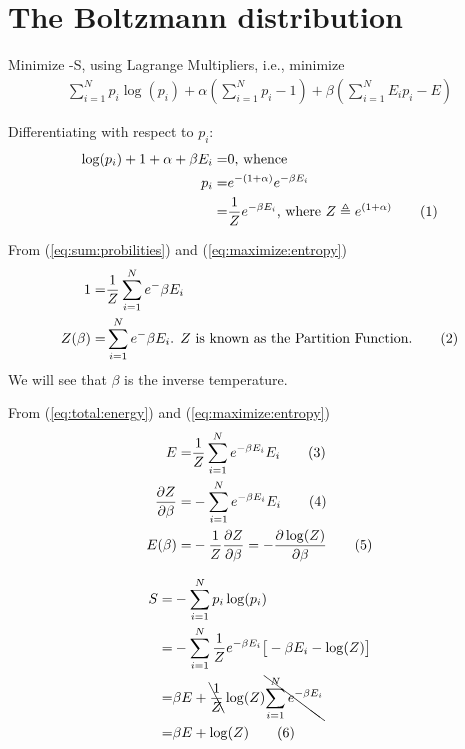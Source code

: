 \documentclass[]{article}
\newcommand\numberthis{\addtocounter{equation}{1}\tag{\theequation}}
\begin{document}
\section{The Boltzmann distribution}

Minimize -S, using Lagrange Multipliers, i.e., minimize
\begin{align*}
\sum_{i=1}^{N}p_i \log(p_i) + \alpha(\sum_{i=1}^{N} p_i-1) + \beta(\sum_{i=1}^{N} E_i p_i-E)
\end{align*}

Differentiating with respect to $p_i$:
\begin{align*}
\log(p_i)+1 + \alpha +\beta E_i=&0\text{, whence}\\
p_i =& e^{-(1+\alpha)} e^{-\beta E_i}\\
=& \frac{1}{Z} e^{-\beta E_i}\text{, where $Z\triangleq e^{(1+\alpha)}$} \numberthis\label{eq:maximize:entropy}
\end{align*}

From (\ref{eq:sum:probilities}) and (\ref{eq:maximize:entropy})
\begin{align*}
1 =& \frac{1}{Z}  \sum_{i=1}^{N} e^-{\beta E_i}\\
Z(\beta) =& \sum_{i=1}^{N} e^-{\beta E_i} \text{. $Z$ is known as the Partition Function.} \numberthis \label{eq:partition:function}
\end{align*}
We will see that $\beta$ is the inverse temperature.

From (\ref{eq:total:energy}) and (\ref{eq:maximize:entropy})
\begin{align*}
E =& \frac{1}{Z}  \sum_{i=1}^{N} e^{-\beta E_i} E_i \numberthis \label{eq:E}\\
\frac{\partial Z}{\partial \beta} =& - \sum_{i=1}^{N} e^{-\beta E_i} E_i \numberthis \label{eq:dZ}\\
E(\beta) =& - \frac{1}{Z} \frac{\partial Z}{\partial \beta} = - \frac{\partial \log(Z)}{\partial \beta} \numberthis \label{eq:E:beta}
\end{align*}

\begin{align*}
S =& -\sum_{i=1}^{N} p_i \log(p_i)\\
=& - \sum_{i=1}^{N} \frac{1}{Z} e^{- \beta E_i}\big[- \beta E_i -\log(Z)\big]\\
=& \beta E +  \bcancel{\frac{1}{Z}} \log(Z)  \bcancel{\sum_{i=1}^{N} e^{-\beta E_i}}\\
=& \beta E +   \log(Z)  \numberthis \label{eq:S_Z}
\end{align*}
\end{document}
